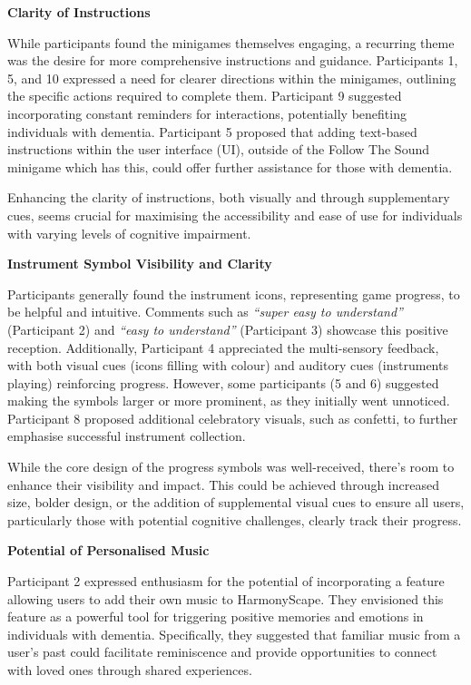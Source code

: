 \documentclass{l4proj}
\begin{document}
\textbf{Clarity of Instructions}

While participants found the minigames themselves engaging, a recurring theme was the desire for more comprehensive instructions and guidance. Participants 1, 5, and 10 expressed a need for clearer directions within the minigames, outlining the specific actions required to complete them. Participant 9 suggested incorporating constant reminders for interactions, potentially benefiting individuals with dementia. Participant 5 proposed that adding text-based instructions within the user interface (UI), outside of the Follow The Sound minigame which has this, could offer further assistance for those with dementia. 

Enhancing the clarity of instructions, both visually and through supplementary cues, seems crucial for maximising the accessibility and ease of use for individuals with varying levels of cognitive impairment.
\newline

\textbf{Instrument Symbol Visibility and Clarity}

Participants generally found the instrument icons, representing game progress, to be helpful and intuitive. Comments such as \emph{“super easy to understand”} (Participant 2) and \emph{“easy to understand”} (Participant 3) showcase this positive reception. Additionally, Participant 4 appreciated the multi-sensory feedback, with both visual cues (icons filling with colour) and auditory cues (instruments playing) reinforcing progress. However, some participants (5 and 6) suggested making the symbols larger or more prominent, as they initially went unnoticed. Participant 8 proposed additional celebratory visuals, such as confetti, to further emphasise successful instrument collection. 

While the core design of the progress symbols was well-received, there's room to enhance their visibility and impact. This could be achieved through increased size, bolder design, or the addition of supplemental visual cues to ensure all users, particularly those with potential cognitive challenges, clearly track their progress.
\newline

\textbf{Potential of Personalised Music}

Participant 2 expressed enthusiasm for the potential of incorporating a feature allowing users to add their own music to HarmonyScape. They envisioned this feature as a powerful tool for triggering positive memories and emotions in individuals with dementia. Specifically, they suggested that familiar music from a user's past could facilitate reminiscence and provide opportunities to connect with loved ones through shared experiences.
\end{document}
